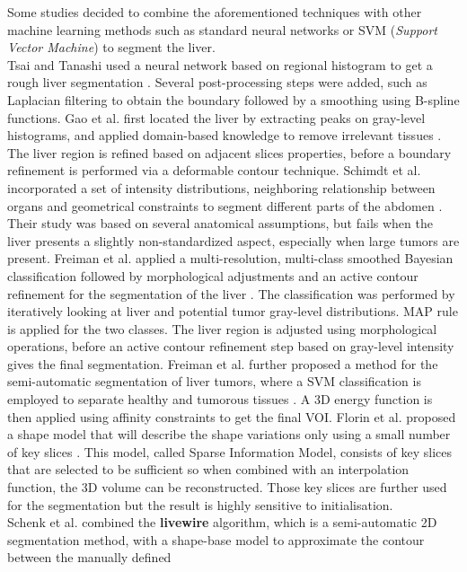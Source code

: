 \documentclass[]{article}
\begin{document}
Some studies decided to combine the aforementioned techniques with other
machine learning methods such as standard neural networks or SVM
(\emph{Support Vector Machine}) to segment the liver.\\
Tsai and Tanashi used a neural network based on regional histogram to get
a rough liver segmentation \cite{Tsai1994}. Several post-processing steps were added,
such as Laplacian filtering to obtain the boundary followed by a
smoothing using B-spline functions.
Gao et al. first located the liver by extracting peaks on gray-level
histograms, and applied domain-based knowledge to remove irrelevant
tissues \cite{Gao1996}. The liver region is refined based on adjacent slices
properties, before a boundary refinement is performed via a deformable
contour technique.
Schimdt et al. incorporated a set of intensity distributions,
neighboring relationship between organs and geometrical constraints to
segment different parts of the abdomen \cite{Schmidt2007}. Their study was based on several
anatomical assumptions, but fails when the liver presents a slightly
non-standardized aspect, especially when large tumors are present.
Freiman et al. applied a multi-resolution, multi-class smoothed Bayesian
classification followed by morphological adjustments and an active
contour refinement for the segmentation of the liver \cite{Freiman2008}. The classification
was performed by iteratively looking at liver and potential tumor
gray-level distributions. MAP rule is applied for the two classes. The
liver region is adjusted using morphological operations, before an
active contour refinement step based on gray-level intensity gives the
final segmentation.
Freiman et al. further proposed a method for the semi-automatic segmentation of
liver tumors, where a SVM classification is employed to separate healthy
and tumorous tissues \cite{Freiman2011}. A 3D energy function is then applied using
affinity constraints to get the final VOI.
Florin et al. proposed a shape model that will describe the shape
variations only using a small number of key slices \cite{Florin2007}. This model, called Sparse Information Model, consists of key slices that are selected to be
sufficient so when combined with an interpolation function, the 3D
volume can be reconstructed. Those key slices are further used for the
segmentation but the result is highly sensitive to initialisation.\\
Schenk et al. combined the \textbf{livewire} algorithm, which is a semi-automatic 2D segmentation method, with a
shape-base model to approximate the contour between the manually defined
\end{document}
